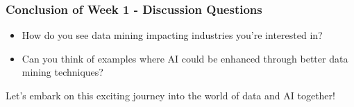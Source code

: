\documentclass[aspectratio=169]{beamer}
\begin{document}
\begin{frame}[fragile]
  \frametitle{Conclusion of Week 1 - Discussion Questions}
  
  \begin{itemize}
    \item How do you see data mining impacting industries you're interested in?
    \item Can you think of examples where AI could be enhanced through better data mining techniques?
  \end{itemize}

  \begin{block}{}
    Let’s embark on this exciting journey into the world of data and AI together!
  \end{block}
\end{frame}
\end{document}
